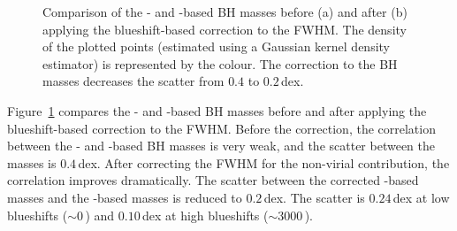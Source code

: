 \begin{figure}
    \captionsetup[subfigure]{labelformat=empty}
    \centering
    \subfloat[\label{fig:bhm_comparison_a}]{}
    \subfloat[\label{fig:bhm_comparison_b}]{}
    \caption[{Comparison of the - and \hans-based BH masses before and after applying the  blueshift-based correction to the  FWHM.}]{Comparison of the - and \hans-based BH masses before (a) and after (b) applying the  blueshift-based correction to the  FWHM. The density of the plotted points (estimated using a Gaussian kernel density estimator) is represented by the colour. The correction to the  BH masses decreases the scatter from $0.4$ to $0.2$\,dex.}
    \label{fig:bhm_comparison}
\end{figure}

Figure~\ref{fig:bhm_comparison} compares the - and \hans-based BH masses before and after applying the blueshift-based correction to the  FWHM.
Before the correction, the correlation between the - and \hans-based BH masses is very weak, and the scatter between the masses is $0.4$\,dex.
After correcting the  FWHM for the non-virial contribution, the correlation improves dramatically.
The scatter between the corrected -based masses and the \hans-based masses is reduced to $0.2$\,dex.
The scatter is $0.24$\,dex at low  blueshifts ($\sim0$\,\kms) and $0.10$\,dex at high blueshifts ($\sim3000$\,\kms).

